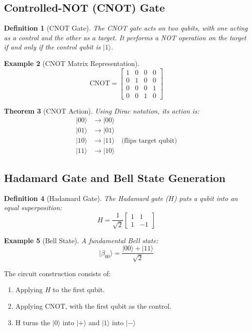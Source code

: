 \documentclass{article}
\newtheorem{theorem}{Theorem}[subsection]
\newtheorem{definition}[theorem]{Definition}
\newtheorem{example}[theorem]{Example}
\begin{document}
\subsection{Controlled-NOT (CNOT) Gate}
\begin{definition}[CNOT Gate]
The CNOT gate acts on two qubits, with one acting as a control and the other as a target. It performs a NOT operation on the target if and only if the control qubit is \(|1\rangle\).
\end{definition}

\begin{example}[CNOT Matrix Representation]
\[
\text{CNOT} = \begin{bmatrix} 1 & 0 & 0 & 0 \\ 0 & 1 & 0 & 0 \\ 0 & 0 & 0 & 1 \\ 0 & 0 & 1 & 0 \end{bmatrix}
\]
\end{example}

\begin{theorem}[CNOT Action]
Using Dirac notation, its action is:
\begin{align*}
|00\rangle &\to |00\rangle \\
|01\rangle &\to |01\rangle \\
|10\rangle &\to |11\rangle \quad \text{(flips target qubit)} \\
|11\rangle &\to |10\rangle
\end{align*}
\end{theorem}

\subsection{Hadamard Gate and Bell State Generation}
\begin{definition}[Hadamard Gate]
The Hadamard gate (\(H\)) puts a qubit into an equal superposition:
\[
H = \frac{1}{\sqrt{2}} \begin{bmatrix} 1 & 1 \\ 1 & -1 \end{bmatrix}
\]
\end{definition}

\begin{example}[Bell State]
A fundamental Bell state:
\[
|\beta_{00}\rangle = \frac{|00\rangle + |11\rangle}{\sqrt{2}}
\]
\end{example}

The circuit construction consists of:
\begin{enumerate}
    \item Applying \(H\) to the first qubit.
    \item Applying CNOT, with the first qubit as the control.
    \item H turns the \(|0\rangle\) into \(|+\rangle\) and \(|1\rangle\) into \(|-\rangle\)
\end{enumerate}
\end{document}
